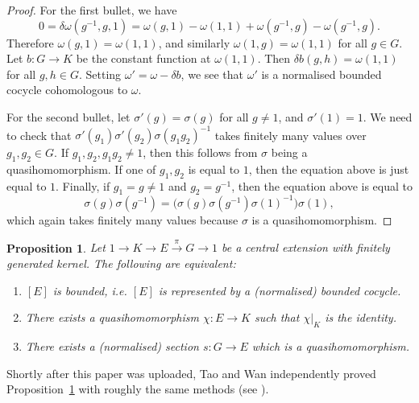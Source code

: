 \documentclass[svgnames]{amsart}
\theoremstyle{plain}
\newtheorem{prop}[thm]{Proposition}
\theoremstyle{definition}
\begin{document}
\begin{proof}
    For the first bullet, we have
    \[0 = \delta \omega(g^{-1}, g, 1) = \omega(g, 1) - \omega(1, 1) + \omega(g^{-1}, g) - \omega(g^{-1}, g).\]
    Therefore $\omega(g, 1) = \omega(1, 1)$, and similarly $\omega(1, g) = \omega(1, 1)$ for all $g \in G$. Let $b \colon G \to K$ be the constant function at $\omega(1, 1)$. Then $\delta b(g, h) = \omega(1, 1)$ for all $g, h \in G$. Setting $\omega' = \omega - \delta b$, we see that $\omega'$ is a normalised bounded cocycle cohomologous to $\omega$.
    
    For the second bullet, let $\sigma'(g) = \sigma(g)$ for all $g \neq 1$, and $\sigma'(1) = 1$. We need to check that $\sigma'(g_1) \sigma'(g_2)\sigma(g_1g_2)^{-1}$ takes finitely many values over $g_1, g_2 \in G$. If $g_1, g_2, g_1g_2 \neq 1$, then this follows from $\sigma$ being a quasihomomorphism. If one of $g_1, g_2$ is equal to $1$, then the equation above is just equal to $1$. Finally, if $g_1 = g \neq 1$ and $g_2 = g^{-1}$, then the equation above is equal to
    \[\sigma(g)\sigma(g^{-1}) = \big( \sigma(g)\sigma(g^{-1}) \sigma(1)^{-1} \big) \sigma(1),\]
    which again takes finitely many values because $\sigma$ is a quasihomomorphism.
\end{proof}

\begin{prop}\label{bounded via qm:abelian_ker}
    Let $1 \to K \to E \xrightarrow{\pi} G \to 1$ be a central extension with finitely generated kernel. The following are equivalent:
    \begin{enumerate}
        \item $[E]$ is bounded, i.e. $[E]$ is represented by a (normalised) bounded cocycle.
        \item There exists a quasihomomorphism $\chi \colon E \to K$ such that $\chi|_K$ is the identity.
        \item There exists a (normalised) section $s \colon G \to E$ which is a quasihomomorphism.
    \end{enumerate}
\end{prop}

Shortly after this paper was uploaded, Tao and Wan independently proved Proposition~\ref{bounded via qm:abelian_ker} with roughly the same methods (see \cite[Lemma 5.5]{tao2025properactionsfiniteproducts}).
\end{document}
